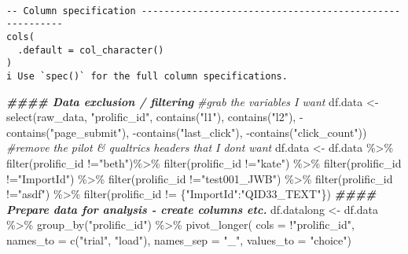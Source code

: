 \documentclass[
]{article}
\newenvironment{Shaded}{\begin{snugshade}}{\end{snugshade}}
\newcommand{\AttributeTok}[1]{\textcolor[rgb]{0.77,0.63,0.00}{#1}}
\newcommand{\CommentTok}[1]{\textcolor[rgb]{0.56,0.35,0.01}{\textit{#1}}}
\newcommand{\DocumentationTok}[1]{\textcolor[rgb]{0.56,0.35,0.01}{\textbf{\textit{#1}}}}
\newcommand{\FunctionTok}[1]{\textcolor[rgb]{0.00,0.00,0.00}{#1}}
\newcommand{\NormalTok}[1]{#1}
\newcommand{\OtherTok}[1]{\textcolor[rgb]{0.56,0.35,0.01}{#1}}
\newcommand{\SpecialCharTok}[1]{\textcolor[rgb]{0.00,0.00,0.00}{#1}}
\newcommand{\StringTok}[1]{\textcolor[rgb]{0.31,0.60,0.02}{#1}}
\begin{document}
\begin{verbatim}

-- Column specification --------------------------------------------------------
cols(
  .default = col_character()
)
i Use `spec()` for the full column specifications.
\end{verbatim}

\begin{Shaded}
\begin{Highlighting}[]
\DocumentationTok{\#\#\#\# Data exclusion / filtering}
\CommentTok{\#grab the variables I want}
\NormalTok{df.data }\OtherTok{\textless{}{-}} \FunctionTok{select}\NormalTok{(raw\_data,}
                  \StringTok{"prolific\_id"}\NormalTok{,}
                  \FunctionTok{contains}\NormalTok{(}\StringTok{"l1"}\NormalTok{),}
                  \FunctionTok{contains}\NormalTok{(}\StringTok{"l2"}\NormalTok{),}
                  \SpecialCharTok{{-}}\FunctionTok{contains}\NormalTok{(}\StringTok{"page\_submit"}\NormalTok{),}
                  \SpecialCharTok{{-}}\FunctionTok{contains}\NormalTok{(}\StringTok{"last\_click"}\NormalTok{),}
                  \SpecialCharTok{{-}}\FunctionTok{contains}\NormalTok{(}\StringTok{"click\_count"}\NormalTok{)) }
\CommentTok{\#remove the pilot \& qualtrics headers that I don\textquotesingle{}t want}
\NormalTok{df.data }\OtherTok{\textless{}{-}}\NormalTok{ df.data }\SpecialCharTok{\%\textgreater{}\%} 
  \FunctionTok{filter}\NormalTok{(prolific\_id }\SpecialCharTok{!=}\StringTok{"beth"}\NormalTok{)}\SpecialCharTok{\%\textgreater{}\%} 
  \FunctionTok{filter}\NormalTok{(prolific\_id }\SpecialCharTok{!=}\StringTok{"kate"}\NormalTok{) }\SpecialCharTok{\%\textgreater{}\%} 
  \FunctionTok{filter}\NormalTok{(prolific\_id }\SpecialCharTok{!=}\StringTok{"ImportId"}\NormalTok{) }\SpecialCharTok{\%\textgreater{}\%} 
  \FunctionTok{filter}\NormalTok{(prolific\_id }\SpecialCharTok{!=}\StringTok{"test001\_JWB"}\NormalTok{) }\SpecialCharTok{\%\textgreater{}\%} 
  \FunctionTok{filter}\NormalTok{(prolific\_id }\SpecialCharTok{!=}\StringTok{"asdf"}\NormalTok{) }\SpecialCharTok{\%\textgreater{}\%} 
  \FunctionTok{filter}\NormalTok{(prolific\_id }\SpecialCharTok{!=} \StringTok{\textquotesingle{}\{"ImportId":"QID33\_TEXT"\}\textquotesingle{}}\NormalTok{) }
\DocumentationTok{\#\#\#\# Prepare data for analysis {-} create columns etc.}
\NormalTok{df.datalong }\OtherTok{\textless{}{-}}\NormalTok{ df.data }\SpecialCharTok{\%\textgreater{}\%} 
  \FunctionTok{group\_by}\NormalTok{(}\StringTok{"prolific\_id"}\NormalTok{) }\SpecialCharTok{\%\textgreater{}\%} 
  \FunctionTok{pivot\_longer}\NormalTok{(}
    \AttributeTok{cols =} \SpecialCharTok{!}\StringTok{"prolific\_id"}\NormalTok{,}
    \AttributeTok{names\_to =} \FunctionTok{c}\NormalTok{(}\StringTok{"trial"}\NormalTok{, }\StringTok{"load"}\NormalTok{),}
    \AttributeTok{names\_sep =} \StringTok{"\_"}\NormalTok{,}
    \AttributeTok{values\_to =} \StringTok{"choice"}\NormalTok{) }
\end{Highlighting}
\end{Shaded}
\end{document}
